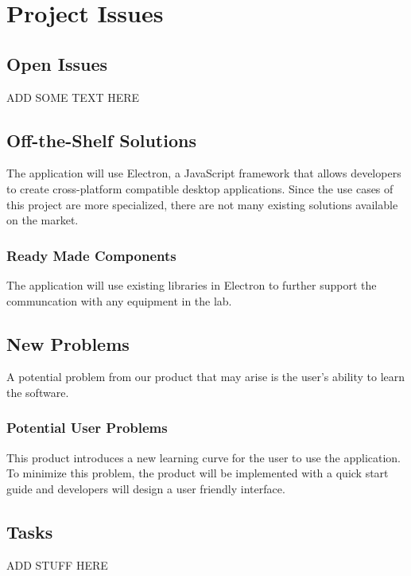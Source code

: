 \documentclass[12pt, titlepage]{article}
\begin{document}
\section{Project Issues}

\subsection{Open Issues}

ADD SOME TEXT HERE

\subsection{Off-the-Shelf Solutions}
The application will use Electron, a JavaScript framework that allows developers to create cross-platform compatible desktop applications. 
Since the use cases of this project are more specialized, there are not many existing solutions available on the market.

\subsubsection{Ready Made Components}
The application will use existing libraries in Electron to further support the communcation with any equipment in the lab.

\subsection{New Problems}
 A potential problem from our product that may arise is the user's ability to learn the software.
  \subsubsection{Potential User Problems}
This product introduces a new learning curve for the user to use the application. 
To minimize this problem, the product will be implemented with a quick start guide and developers will design a user friendly interface.


\subsection{Tasks}
ADD STUFF HERE 
\end{document}
